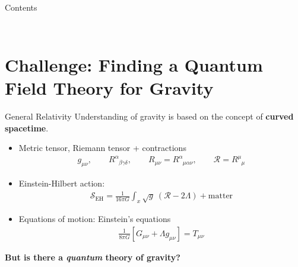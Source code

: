 \documentclass{beamer}
\begin{document}
\maketitle

\begin{frame}{Contents}
\begin{columns}
\begin{column}{\textwidth}
{\vspace{-0.5cm}
\tableofcontents
}	
\end{column}
\end{columns}
\end{frame}

\section{Challenge: Finding a Quantum Field Theory for Gravity}
\begin{frame}{General Relativity}
Understanding of gravity is based on the concept of \textbf{curved spacetime}.
\begin{itemize}
	\item Metric tensor, Riemann tensor + contractions
	\begin{align}
	g_{\mu\nu}, \qquad R_{\phantom{\alpha}\beta \gamma \delta}^{\alpha}, \qquad
R_{\mu\nu} = R^{\alpha}_{\phantom{\alpha}\mu\alpha\nu}, \qquad \mathcal{R} = R^{\mu}_{\phantom{\mu}\mu}
\end{align}
	\item Einstein-Hilbert action:
	\begin{align}
	\mathcal{S}_{\text{EH}} = \frac{1}{16\pi G} \int_x \sqrt{g} \ (\mathcal{R} - 2\Lambda) + \text{matter}
	\end{align}
	\item Equations of motion: Einstein's equations
	\begin{align}
	\frac{1}{8\pi G}\left[G_{\mu\nu} + \Lambda g_{\mu\nu}\right] = T_{\mu\nu}	
	\end{align}
	\end{itemize}	
\centering\bfseries\large
But is there a \textit{quantum} theory of gravity?
\end{frame}
\end{document}
